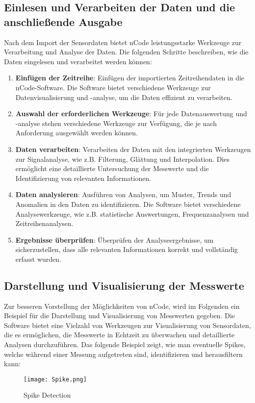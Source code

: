 \subsection{Einlesen und Verarbeiten der Daten und die anschließende Ausgabe}
Nach dem Import der Sensordaten bietet nCode leistungsstarke Werkzeuge zur Verarbeitung und Analyse der Daten. Die folgenden Schritte beschreiben, wie die Daten eingelesen und verarbeitet werden können:

\begin{enumerate}
    \item \textbf{Einfügen der Zeitreihe}: Einfügen der importierten Zeitreihendaten in die nCode-Software. Die Software bietet verschiedene Werkzeuge zur Datenvisualisierung und -analyse, um die Daten effizient zu verarbeiten.
    \item \textbf{Auswahl der erforderlichen Werkzeuge}: Für jede Datenauswertung und -analyse stehen verschiedene Werkzeuge zur Verfügung, die je nach Anforderung ausgewählt werden können.
    \item \textbf{Daten verarbeiten}: Verarbeiten der Daten mit den integrierten Werkzeugen zur Signalanalyse, wie z.B. Filterung, Glättung und Interpolation. Dies ermöglicht eine detaillierte Untersuchung der Messwerte und die Identifizierung von relevanten Informationen.
    \item \textbf{Daten analysieren}: Ausführen von Analysen, um Muster, Trends und Anomalien in den Daten zu identifizieren. Die Software bietet verschiedene Analysewerkzeuge, wie z.B. statistische Auswertungen, Frequenzanalysen und Zeitreihenanalysen.
    \item \textbf{Ergebnisse überprüfen}: Überprüfen der Analyseergebnisse, um sicherzustellen, dass alle relevanten Informationen korrekt und vollständig erfasst wurden.   
\end{enumerate}

\subsection{Darstellung und Visualisierung der Messwerte}
Zur besseren Vorstellung der Möglichkeiten von nCode, wird im Folgenden ein Beispiel für die Darstellung und Visualisierung von Messwerten gegeben. Die Software bietet eine Vielzahl von Werkzeugen zur Visualisierung von Sensordaten, die es ermöglichen, die Messwerte in Echtzeit zu überwachen und detaillierte Analysen durchzuführen. Das folgende Beispiel zeigt, wie man eventuelle Spikes, welche während einer Messung aufgetreten sind, identifizieren und herausfiltern kann:

\begin{figure}[h]
    \begin{center}
        \texttt{[image: Spike.png]}
        \caption[Spike Detection in nCode]{Spike Detection
        }
        \label{fig:Spike}
    \end{center}
\end{figure}